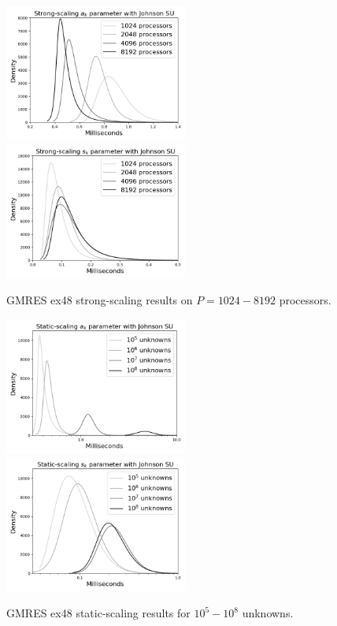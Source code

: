 \documentclass[num-refs]{wiley-article}
\begin{document}
\begin{figure}[t]
\centering
\includegraphics[width=6cm]{../plots/GMRES_ex48_1000000_a_k_strong_scaling_johnsonsu.png}
\includegraphics[width=6cm]{../plots/GMRES_ex48_1000000_s_k_strong_scaling_johnsonsu.png} 
\caption{GMRES ex48 strong-scaling results on $P = 1024 - 8192$ processors.} \label{fig:strong-scaling}
\end{figure}
 
\begin{figure}[b]
\centering
\includegraphics[width=6cm]{../plots/GMRES_ex48_1000000_a_k_static_scaling_johnsonsu.png}
\includegraphics[width=6cm]{../plots/GMRES_ex48_1000000_s_k_static_scaling_johnsonsu.png} 
\caption{GMRES ex48 static-scaling results for $10^5 - 10^8$ unknowns.} \label{fig:static-scaling}
\end{figure}
\end{document}
